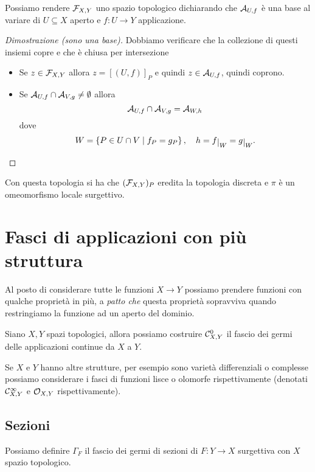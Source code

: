 Possiamo rendere $\mathcal{F}_{X,Y}$ uno spazio topologico dichiarando che $\mathcal{A}_{U,f}$ \`e una base al variare di $U\subseteq X$ aperto e $f:U\to Y$ applicazione.
\begin{proof}[Dimostrazione (sono una base)]
Dobbiamo verificare che la collezione di questi insiemi copre e che \`e chiusa per intersezione
\setlength{\leftmargini}{0cm}
\begin{itemize}
\item Se $z\in \mathcal{F}_{X,Y}$ allora $z=[(U,f)]_P$ e quindi $z\in \mathcal{A}_{U,f}$, quindi coprono.
\item Se $\mathcal{A}_{U,f}\cap \mathcal{A}_{V,g}\neq \emptyset$ allora
\[\mathcal{A}_{U,f}\cap \mathcal{A}_{V,g}=\mathcal{A}_{W,h}\]
dove
\[W=\cpa{P\in U\cap V\mid f_P=g_P},\quad h=f\res W=g\res W.\]
\end{itemize}
\setlength{\leftmargini}{0.5cm}
\end{proof}

\begin{remark}
Con questa topologia si ha che $(\mathcal{F}_{X,Y})_P$ eredita la topologia discreta e $\pi$ \`e un omeomorfismo locale surgettivo.
\end{remark}

\section{Fasci di applicazioni con pi\`u struttura}

Al posto di considerare tutte le funzioni $X\to Y$ possiamo prendere funzioni con qualche propriet\`a in pi\`u, a \textit{patto che} questa propriet\`a sopravviva quando restringiamo la funzione ad un aperto del dominio.

\begin{example}
Siano $X,Y$ spazi topologici, allora possiamo costruire $\mathcal{C}^0_{X,Y}$ il fascio dei germi delle applicazioni continue da $X$ a $Y$.
\end{example}

Se $X$ e $Y$ hanno altre strutture, per esempio sono variet\`a differenziali o complesse possiamo considerare i fasci di funzioni lisce o olomorfe rispettivamente (denotati $\mathcal{C}^\infty_{X,Y}$ e $\mathcal{O}_{X,Y}$ rispettivamente).

\subsection{Sezioni}
Possiamo definire $\Gamma_F$ il fascio dei germi di sezioni di $F:Y\to X$ surgettiva con $X$ spazio topologico.

